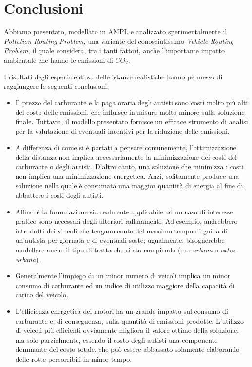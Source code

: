 \chapter{Conclusioni}\label{ch:conclusioni}
	Abbiamo presentato, modellato in AMPL e analizzato sperimentalmente il \emph{Pollution Routing Problem}, una variante del conosciutissimo \emph{Vehicle Routing Problem}, il quale considera, tra i tanti fattori, anche  l’importante impatto ambientale che hanno le emissioni di $CO_2$.

	I risultati degli esperimenti su delle istanze realistiche hanno permesso di raggiungere le seguenti conclusioni:
	\begin{itemize}
		\item Il prezzo del carburante e la paga oraria degli autisti sono costi molto più alti del costo delle emissioni, che influisce in misura molto minore sulla soluzione finale. Tuttavia, il modello presentato fornisce un efficace strumento di analisi per la valutazione di eventuali incentivi per la riduzione delle emissioni.
		\item A differenza di come si è portati a pensare comunemente, l’ottimizzazione della distanza non implica necessariamente la minimizzazione dei costi del carburante o degli autisti. D’altro canto, una soluzione che minimizza i costi non implica una minimizzazione energetica. Anzi, solitamente produce una soluzione nella quale è consumata una maggior quantità di energia al fine di abbattere i costi degli autisti.
		\item Affinché la formulazione sia realmente applicabile ad un caso di interesse pratico sono necessari degli ulteriori raffinamenti. Ad esempio, andrebbero introdotti dei vincoli che tengano conto del massimo tempo di guida di un’autista per giornata e di eventuali soste; ugualmente, bisognerebbe modellare anche il tipo di tratta che si sta compiendo (es.: \emph{urbana} o \emph{extra-urbana}).
		\item Generalmente l’impiego di un minor numero di veicoli implica un minor consumo di carburante ed un indice di utilizzo maggiore della capacità di carico del veicolo.
		\item L’efficienza energetica dei motori ha un grande impatto sul consumo di carburante e, di conseguenza, sulla quantità di emissioni prodotte. L’utilizzo di veicoli più efficienti ovviamente migliora il valore ottimo della soluzione, ma solo parzialmente, essendo il costo degli autisti una componente dominante del costo totale, che può essere abbassato solamente elaborando delle rotte percorribili in minor tempo. 
	\end{itemize}